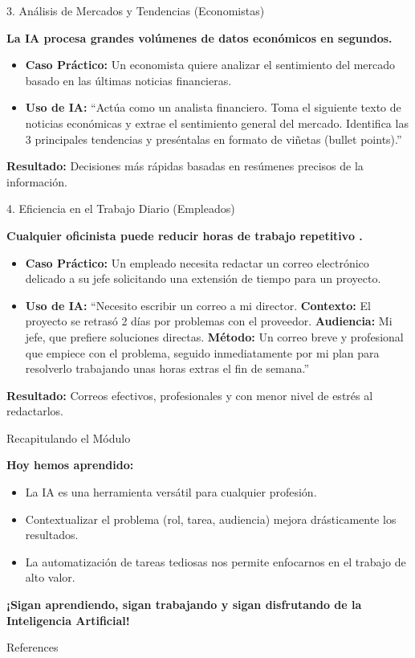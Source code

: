 \documentclass[aspectratio=169]{beamer}
\begin{document}
\begin{frame}[fragile]{3. Análisis de Mercados y Tendencias (Economistas)}


\textbf{La IA procesa grandes volúmenes de datos económicos en segundos.}

\begin{itemize}
  \item \textbf{Caso Práctico:} Un economista quiere analizar el sentimiento del mercado basado en las últimas noticias financieras.
  \item \textbf{Uso de IA:} ``Actúa como un analista financiero. Toma el siguiente texto de noticias económicas y extrae el sentimiento general del mercado. Identifica las 3 principales tendencias y preséntalas en formato de viñetas (bullet points).''
\end{itemize}
\textbf{Resultado:} Decisiones más rápidas basadas en resúmenes precisos de la información.

\end{frame}



\begin{frame}[fragile]{4. Eficiencia en el Trabajo Diario (Empleados)}


\textbf{Cualquier oficinista puede reducir horas de trabajo repetitivo \cite{brynjolfsson2023}.}

\begin{itemize}
  \item \textbf{Caso Práctico:} Un empleado necesita redactar un correo electrónico delicado a su jefe solicitando una extensión de tiempo para un proyecto.
  \item \textbf{Uso de IA:} ``Necesito escribir un correo a mi director. \textbf{Contexto:} El proyecto se retrasó 2 días por problemas con el proveedor. \textbf{Audiencia:} Mi jefe, que prefiere soluciones directas. \textbf{Método:} Un correo breve y profesional que empiece con el problema, seguido inmediatamente por mi plan para resolverlo trabajando unas horas extras el fin de semana.''
\end{itemize}
\textbf{Resultado:} Correos efectivos, profesionales y con menor nivel de estrés al redactarlos.

\end{frame}



\begin{frame}[fragile]{Recapitulando el Módulo}


\textbf{Hoy hemos aprendido:}
\begin{itemize}
  \item La IA es una herramienta versátil para cualquier profesión.
  \item Contextualizar el problema (rol, tarea, audiencia) mejora drásticamente los resultados.
  \item La automatización de tareas tediosas nos permite enfocarnos en el trabajo de alto valor.
\end{itemize}
\textbf{¡Sigan aprendiendo, sigan trabajando y sigan disfrutando de la Inteligencia Artificial!}
\end{frame}




\begin{frame}[allowframebreaks]{References}
  
  
\end{frame}
\end{document}
